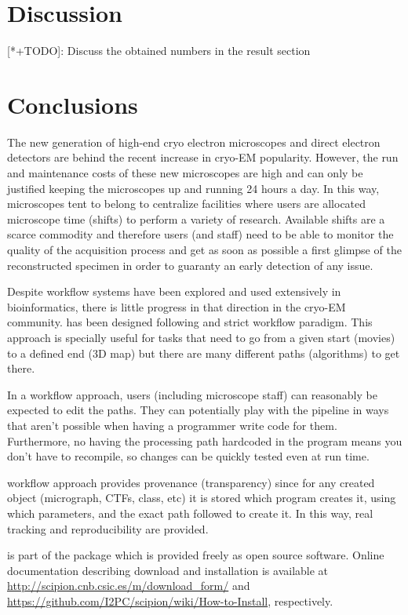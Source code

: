 \section{Discussion}
[*+TODO]: Discuss the obtained numbers in the result section

\section{Conclusions}

The new generation of high-end cryo electron microscopes and direct electron detectors are behind the recent increase in cryo-EM  popularity. However, the run and maintenance costs of these new microscopes are high and can only be justified keeping the microscopes up and running 24 hours a day. In this way, microscopes tent to belong to centralize facilities where users are allocated microscope time (shifts) to perform a variety of research. Available shifts are a scarce commodity and therefore users (and staff) need to be able to monitor the quality of the acquisition process and get as soon as possible a first glimpse of the reconstructed specimen in order to guaranty an early detection of any issue. 

 Despite workflow systems have been explored and used extensively in bioinformatics, there is little progress in that direction in the cryo-EM community. \scipionbox has been designed following and strict workflow paradigm. This approach is specially useful for tasks that need to go from a given start (movies) to a defined end (3D map) but there are many different paths (algorithms) to get there.
 
 In a workflow approach, users (including microscope staff) can reasonably be expected to edit the paths. They can potentially play with the pipeline in ways that aren't possible when having a programmer write code for them. Furthermore, no having the processing path hardcoded in the program means you don't have to recompile, so changes can be quickly tested   even at run time.
 
 \scipionbox workflow approach provides provenance (transparency) since for any created object (micrograph, CTFs, class, etc) it is stored which program creates it, using which parameters, and the exact path followed to create it.  In this way,  real tracking and reproducibility are provided. 

 
\scipionbox is part of the \scipion package which is provided 
freely as open source software. Online documentation
describing \scipion download and installation is available
at \url{http://scipion.cnb.csic.es/m/download_form/} and \url{https://github.com/I2PC/scipion/wiki/How-to-Install}, respectively.\\\\








 